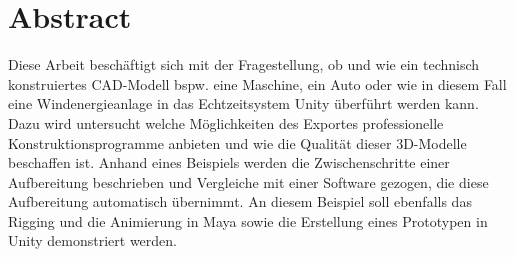 \chapter*{Abstract}

Diese Arbeit beschäftigt sich mit der Fragestellung, ob und wie ein technisch konstruiertes CAD-Modell bspw. eine Maschine, ein Auto oder wie in diesem Fall eine Windenergieanlage in das Echtzeitsystem Unity überführt werden kann. Dazu wird untersucht welche Möglichkeiten des Exportes professionelle Konstruktionsprogramme anbieten und wie die Qualität dieser 3D-Modelle beschaffen ist. Anhand eines Beispiels werden die Zwischenschritte einer Aufbereitung beschrieben und Vergleiche mit einer Software gezogen, die diese Aufbereitung automatisch übernimmt. An diesem Beispiel soll ebenfalls das Rigging und die Animierung in Maya sowie die Erstellung eines Prototypen in Unity demonstriert werden. 